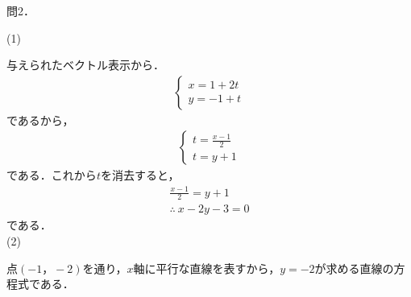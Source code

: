 \documentclass[dvipdfmx,uplatex,11pt]{jsarticle}
\theoremstyle{definition}
\begin{document}
		問2．
		
		\begin{leftbar}
			(1) \par
			与えられたベクトル表示から．
			\begin{align*}
				\begin{cases}
					x=1+2t \\
					y=-1+t
				\end{cases}
			\end{align*}
			であるから，
			\begin{align*}
				\begin{cases}
					t=\frac{x-1}{2} \\
					t=y+1
				\end{cases}
			\end{align*}
			である．これから$t$を消去すると，
			\begin{gather*}
				\frac{x-1}{2} = y+1 \\
				\therefore ~ x-2y-3 =0
			\end{gather*}
			である．\\

			(2) \par 
			点$(-1，-2)$を通り，$x$軸に平行な直線を表すから，$y=-2$が求める直線の方程式である．
		\end{leftbar}
%
\newpage
%
%
%
%
\end{document}
